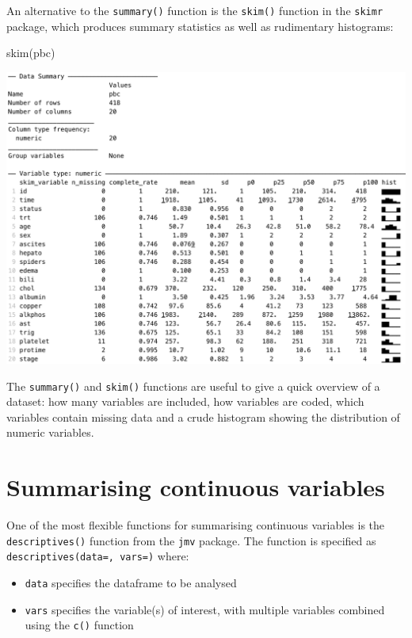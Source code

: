 \documentclass[
]{memoir}
\newenvironment{Shaded}{\begin{snugshade}}{\end{snugshade}}
\newcommand{\FunctionTok}[1]{\textcolor[rgb]{0.00,0.00,0.00}{#1}}
\newcommand{\NormalTok}[1]{#1}
\providecommand{\tightlist}{%
  \setlength{\itemsep}{0pt}\setlength{\parskip}{0pt}}
\begin{document}
An alternative to the \texttt{summary()} function is the \texttt{skim()} function in the \texttt{skimr} package, which produces summary statistics as well as rudimentary histograms:

\begin{Shaded}
\begin{Highlighting}[]
\FunctionTok{skim}\NormalTok{(pbc)}
\end{Highlighting}
\end{Shaded}

\includegraphics[width=0.9\linewidth]{img/skim-pbc}

The \texttt{summary()} and \texttt{skim()} functions are useful to give a quick overview of a dataset: how many variables are included, how variables are coded, which variables contain missing data and a crude histogram showing the distribution of numeric variables.

\hypertarget{summarising-continuous-variables}{%
\section{Summarising continuous variables}\label{summarising-continuous-variables}}

One of the most flexible functions for summarising continuous variables is the \texttt{descriptives()} function from the \texttt{jmv} package. The function is specified as \texttt{descriptives(data=,\ vars=)} where:

\begin{itemize}
\tightlist
\item
  \texttt{data} specifies the dataframe to be analysed
\item
  \texttt{vars} specifies the variable(s) of interest, with multiple variables combined using the \texttt{c()} function
\end{itemize}
\end{document}

